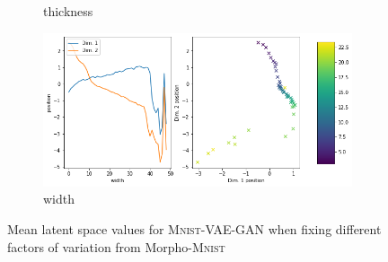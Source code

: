 \begin{figure}[H]
\begin{subfigure}{.48\textwidth}
        \caption{thickness}
    \end{subfigure}
    \begin{subfigure}{.48\textwidth}
        \includegraphics[width=\textwidth]{images/latent_space_traversals/vae_gan_mnist_morpho_latent_space_values_width.png}
        \caption{width}
    \end{subfigure}
    \caption[\textsc{Mnist}-VAE-GAN - Latent Space Values]{Mean latent space values for \textsc{Mnist}-VAE-GAN when fixing different factors of variation from Morpho-\textsc{Mnist}}
    \label{fig:vae_gan_mnist_morpho_latent_space_values}
\end{figure}

